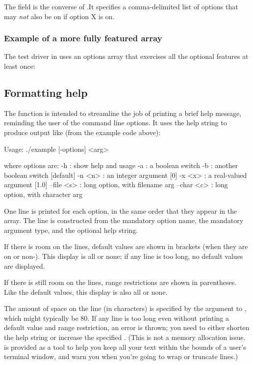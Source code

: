 The  field is the converse of
.It specifies a comma-delimited list of options
that may \emph{not} also be on if option X is on.



   \subsubsection{Example of a more fully featured  array}

The test driver in  uses an options array that
exercises all the optional features at least once:




\subsection{Formatting help}


The  function is intended to streamline
the job of printing a brief help message, reminding the user of the
command line options. It uses the help string to produce output like
(from the example code above):

\begin{cchunk}
Usage: ./example [-options] <arg>

  where options are:
  -h         : show help and usage
  -a         : a boolean switch
  -b         : another boolean switch  [default]
  -n <n>     : an integer argument  [0]
  -x <x>     : a real-valued argument  [1.0]
  --file <s> : long option, with filename arg
  --char <c> : long option, with character arg
\end{cchunk}

One line is printed for each option, in the same order that they
appear in the  array. The line is constructed from
the mandatory option name, the mandatory argument type, and the
optional help string.

If there is room on the lines, default values are shown in brackets
(when they are on or non-). This display is all or none;
if any line is too long, no default values are displayed.

If there is still room on the lines, range restrictions are shown in
parentheses. Like the default values, this display is also all or
none.

The amount of space on the line (in characters) is specified by the
 argument to , which
might typically be 80. If any line is too long even without printing a
default value and range restriction, an error is thrown; you need to
either shorten the help string or increase the specified
. (This is not a memory allocation
issue.  is provided as a tool to help you keep all
your text within the bounds of a user's terminal window, and warn you
when you're going to wrap or truncate lines.)

